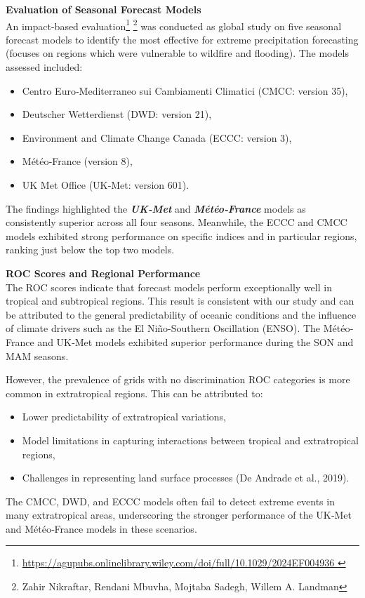 \textbf{Evaluation of Seasonal Forecast Models}\\
An impact-based evaluation\footnote{\url{https://agupubs.onlinelibrary.wiley.com/doi/full/10.1029/2024EF004936 }} \footnote{Zahir Nikraftar, Rendani Mbuvha, Mojtaba Sadegh, Willem A. Landman} was conducted as global study on five seasonal forecast models to identify the most effective for extreme precipitation forecasting (focuses on regions which were vulnerable to wildfire and flooding). The models assessed included:
\begin{itemize}
    \item Centro Euro‐Mediterraneo sui Cambiamenti Climatici (CMCC: version 35),
    \item Deutscher Wetterdienst (DWD: version 21),
    \item Environment and Climate Change Canada (ECCC: version 3),
    \item Météo‐France (version 8),
    \item UK Met Office (UK‐Met: version 601).
\end{itemize}

The findings highlighted the \textbf{\textit{UK‐Met} }  and \textbf{\textit{Météo‐France} } models as consistently superior across all four seasons. Meanwhile, the ECCC and CMCC models exhibited strong performance on specific indices and in particular regions, ranking just below the top two models.

\textbf{ROC Scores and Regional Performance}\\
The ROC scores indicate that forecast models perform exceptionally well in tropical and subtropical regions. This result is consistent with our study and can be attributed to the general predictability of oceanic conditions and the influence of climate drivers such as the El Niño-Southern Oscillation (ENSO). The Météo‐France and UK‐Met models exhibited superior performance during the SON and MAM seasons.

However, the prevalence of grids with no discrimination ROC categories is more common in extratropical regions. This can be attributed to:
\begin{itemize}
    \item Lower predictability of extratropical variations,
    \item Model limitations in capturing interactions between tropical and extratropical regions,
    \item Challenges in representing land surface processes (De Andrade et al., 2019).
\end{itemize}
The CMCC, DWD, and ECCC models often fail to detect extreme events in many extratropical areas, underscoring the stronger performance of the UK‐Met and Météo‐France models in these scenarios.

